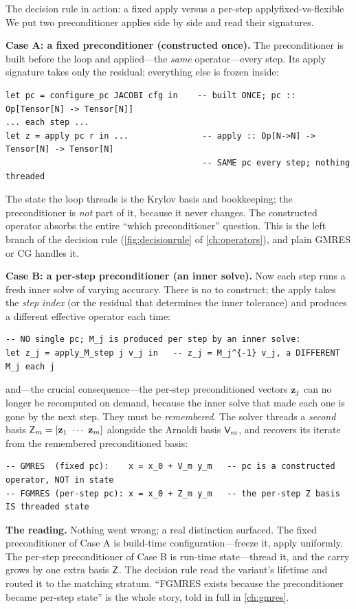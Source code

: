 \begin{workedexample}{The decision rule in action: a fixed apply versus a per-step apply}{fixed-vs-flexible}
We put two preconditioner applies side by side and read their signatures.

\textbf{Case A: a fixed preconditioner (constructed once).} The preconditioner is built
before the loop and applied---the \emph{same} operator---every step. Its apply signature
takes only the residual; everything else is frozen inside:
\begin{lstlisting}[style=l4style]
let pc = configure_pc JACOBI cfg in    -- built ONCE; pc :: Op[Tensor[N] -> Tensor[N]]
... each step ...
let z = apply pc r in ...               -- apply :: Op[N->N] -> Tensor[N] -> Tensor[N]
                                        -- SAME pc every step; nothing threaded
\end{lstlisting}
The state the loop threads is the Krylov basis and bookkeeping; the preconditioner is
\emph{not} part of it, because it never changes. The constructed operator absorbs the entire
``which preconditioner'' question. This is the left branch of the decision rule
(\cref{fig:decisionrule} of \cref{ch:operators}), and plain GMRES or CG handles it.

\textbf{Case B: a per-step preconditioner (an inner solve).} Now each step runs a fresh
inner solve of varying accuracy. There is no  to construct; the apply takes the
\emph{step index} (or the residual that determines the inner tolerance) and produces a
different effective operator each time:
\begin{lstlisting}[style=l4style]
-- NO single pc; M_j is produced per step by an inner solve:
let z_j = apply_M_step j v_j in   -- z_j = M_j^{-1} v_j, a DIFFERENT M_j each j
\end{lstlisting}
and---the crucial consequence---the per-step preconditioned vectors $\mathbf{z}_j$ can no longer be
recomputed on demand, because the inner solve that made each one is gone by the next step.
They must be \emph{remembered}. The solver threads a \emph{second} basis $\mathsf{Z}_m=[\mathbf{z}_1\
\cdots\ \mathbf{z}_m]$ alongside the Arnoldi basis $\mathsf{V}_m$, and recovers its iterate from the
remembered preconditioned basis:
\begin{lstlisting}[style=l4style]
-- GMRES  (fixed pc):    x = x_0 + V_m y_m   -- pc is a constructed operator, NOT in state
-- FGMRES (per-step pc): x = x_0 + Z_m y_m   -- the per-step Z basis IS threaded state
\end{lstlisting}

\textbf{The reading.} Nothing went wrong; a real distinction surfaced. The fixed
preconditioner of Case A is build-time configuration---freeze it, apply uniformly. The
per-step preconditioner of Case B is run-time state---thread it, and the carry grows by one
extra basis $\mathsf{Z}$. The decision rule read the variant's lifetime and routed it to the
matching stratum. ``FGMRES exists because the preconditioner became per-step state'' is the
whole story, told in full in \cref{ch:gmres}.
\end{workedexample}

